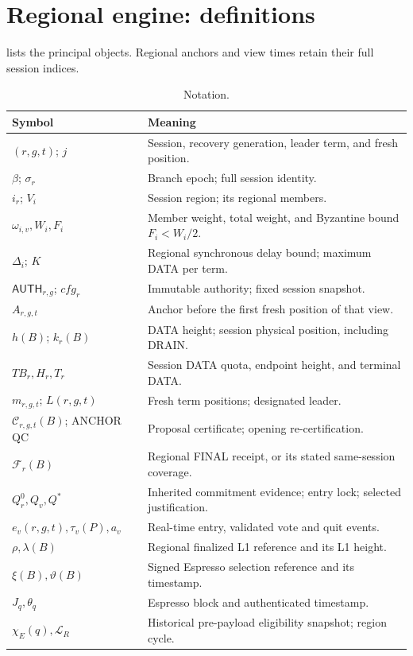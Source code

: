 \documentclass[11pt,a4paper]{article}
\newcommand{\QC}{\mathcal C}
\newcommand{\FC}{\mathcal F}
\newcommand{\TB}{\mathit{TB}}
\newcommand{\tagg}[1]{\ensuremath{\mathsf{#1}}}
\begin{document}
\section{Regional engine: definitions}
\label{sec:regional}
 lists the principal objects. Regional anchors and
view times retain their full session indices.
\begin{table}[htbp]\centering\small
\caption{Notation.}\label{tab:notation}
\begin{tabularx}{\linewidth}{@{}p{.32\linewidth}Y@{}}\toprule
Symbol & Meaning\\\midrule
$(r,g,t)$; $j$ & Session, recovery generation, leader term, and fresh position.\\
$\beta$; $\sigma_r$ & Branch epoch; full session identity.\\
$i_r$; $V_i$ & Session region; its regional members.\\
$\omega_{i,v},W_i,F_i$ & Member weight, total weight, and Byzantine bound $F_i<W_i/2$.\\
$\Delta_i$; $K$ & Regional synchronous delay bound; maximum DATA per term.\\
$\tagg{AUTH}_{r,g}$; $\mathit{cfg}_r$ & Immutable authority; fixed session snapshot.\\
$A_{r,g,t}$ & Anchor before the first fresh position of that view.\\
$h(B)$; $k_r(B)$ & DATA height; session physical position, including DRAIN.\\
$\TB_r,H_r,T_r$ & Session DATA quota, endpoint height, and terminal DATA.\\
$m_{r,g,t}$; $L(r,g,t)$ & Fresh term positions; designated leader.\\
$\QC_{r,g,t}(B)$; ANCHOR QC & Proposal certificate; opening re-certification.\\
$\FC_r(B)$ & Regional FINAL receipt, or its stated same-session coverage.\\
$Q_r^0,Q_v,Q^*$ & Inherited commitment evidence; entry lock; selected justification.\\
$e_v(r,g,t),\tau_v(P),a_v$ & Real-time entry, validated vote and quit events.\\
$\rho,\lambda(B)$ & Regional finalized L1 reference and its L1 height.\\
$\xi(B),\vartheta(B)$ & Signed Espresso selection reference and its timestamp.\\
$J_q,\theta_q$ & Espresso block and authenticated timestamp.\\
$\chi_E(q),\mathcal L_R$ & Historical pre-payload eligibility snapshot; region cycle.\\

\end{tabularx}
\end{table}
\end{document}

